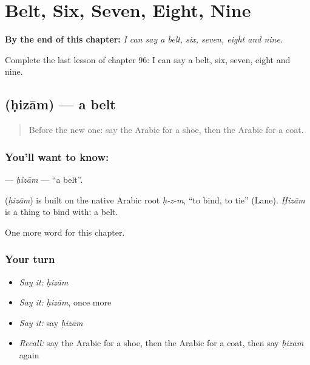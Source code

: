 
\chapter{Belt, Six, Seven, Eight, Nine}
\label{ch:ar-belt-six-seven-eight-nine}

\begin{chapteropening}
\textbf{By the end of this chapter:} \emph{I can say a belt, six, seven, eight and nine.}

Complete the last lesson of chapter 96: I can say a belt, six, seven, eight and nine.
\end{chapteropening}

\section[\texorpdfstring{\ar{حزام} (ḥizām)}{حزام (ḥizām)}]{ (ḥizām) — a belt}

\label{lesson:AR-C96-hizam}



\begin{quote}
Before the new one: say the Arabic for a shoe, then the Arabic for a coat.
\end{quote}

\subsection*{You'll want to know: }
\textbf{} — \emph{ḥizām} — \textquotedblleft{}a belt\textquotedblright{}.

\begin{cousinweb}
\textbf{} (\emph{ḥizām}) is built on the native Arabic root \emph{ḥ-z-m}, \textquotedblleft{}to bind, to tie\textquotedblright{} (Lane). \emph{Ḥizām} is a thing to bind with: a belt.
\end{cousinweb}

\begin{grammarlens}[title={What you've built}]
One more word for this chapter.
\end{grammarlens}

\subsection*{Your turn}
\begin{itemize}
\raggedright
  \item \emph{Say it:} \emph{ḥizām}
  \item \emph{Say it:} \emph{ḥizām}, once more
  \item \emph{Say it:} say \emph{ḥizām}
  \item \emph{Recall:} say the Arabic for a shoe, then the Arabic for a coat, then say \emph{ḥizām} again
\end{itemize}

